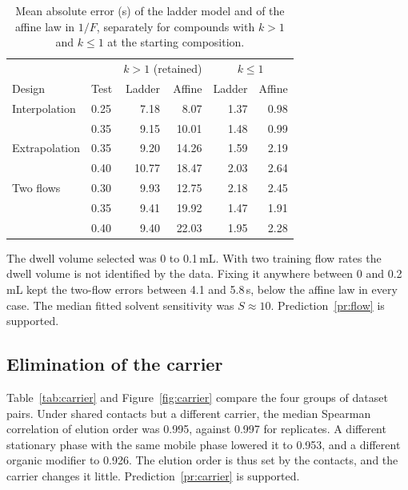 \documentclass[11pt,a4paper]{article}
\theoremstyle{definition}
\theoremstyle{remark}
\begin{document}
\begin{table}[ht]
\centering
\caption{Mean absolute error (s) of the ladder model and of the affine law in $1/F$, separately for compounds with $k>1$ and $k\le1$ at the starting composition.}
\label{tab:split}
\begin{tabular}{@{}llrrrr@{}}
\toprule
 & & \multicolumn{2}{c}{$k>1$ (retained)} & \multicolumn{2}{c}{$k\le1$} \\
Design & Test & Ladder & Affine & Ladder & Affine \\
\midrule
Interpolation & 0.25 & 7.18 & 8.07 & 1.37 & 0.98 \\
              & 0.35 & 9.15 & 10.01 & 1.48 & 0.99 \\
Extrapolation & 0.35 & 9.20 & 14.26 & 1.59 & 2.19 \\
              & 0.40 & 10.77 & 18.47 & 2.03 & 2.64 \\
Two flows     & 0.30 & 9.93 & 12.75 & 2.18 & 2.45 \\
              & 0.35 & 9.41 & 19.92 & 1.47 & 1.91 \\
              & 0.40 & 9.40 & 22.03 & 1.95 & 2.28 \\
\bottomrule
\end{tabular}
\end{table}

The dwell volume selected was 0 to 0.1\,mL.
With two training flow rates the dwell volume is not identified by the data.
Fixing it anywhere between 0 and 0.2\,mL kept the two-flow errors between 4.1 and 5.8\,s, below the affine law in every case.
The median fitted solvent sensitivity was $S\approx10$.
Prediction~\ref{pr:flow} is supported.

\subsection{Elimination of the carrier}

Table~\ref{tab:carrier} and Figure~\ref{fig:carrier} compare the four groups of dataset pairs.
Under shared contacts but a different carrier, the median Spearman correlation of elution order was 0.995, against 0.997 for replicates.
A different stationary phase with the same mobile phase lowered it to 0.953, and a different organic modifier to 0.926.
The elution order is thus set by the contacts, and the carrier changes it little.
Prediction~\ref{pr:carrier} is supported.
\end{document}
